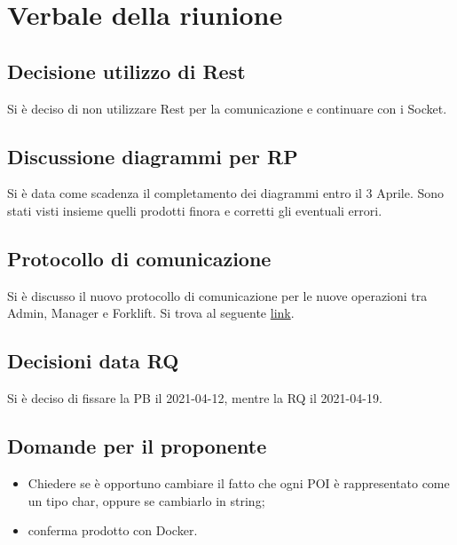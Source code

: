 \section{Verbale della riunione}

\subsection{Decisione utilizzo di Rest}
Si è deciso di non utilizzare Rest per la comunicazione e continuare con i Socket.

\subsection{Discussione diagrammi per RP}
Si è data come scadenza il completamento dei diagrammi entro il 3 Aprile.
Sono stati visti insieme quelli prodotti finora e corretti gli eventuali errori.

\subsection{Protocollo di comunicazione}
Si è discusso il nuovo protocollo di comunicazione per le nuove operazioni tra Admin, Manager e Forklift.
Si trova al seguente \href{https://threewaymilkshake.atlassian.net/wiki/spaces/PORTACS/pages/237764625/Collegamento+NodeJs+Java}{link}.

\subsection{Decisioni data RQ}
Si è deciso di fissare la PB il 2021-04-12, mentre la RQ il 2021-04-19.

\subsection{Domande per il proponente}
\begin{itemize}
	\item Chiedere se è opportuno cambiare il fatto che ogni POI è rappresentato come un tipo char, oppure se cambiarlo in string;
	\item conferma prodotto con Docker.
\end{itemize}